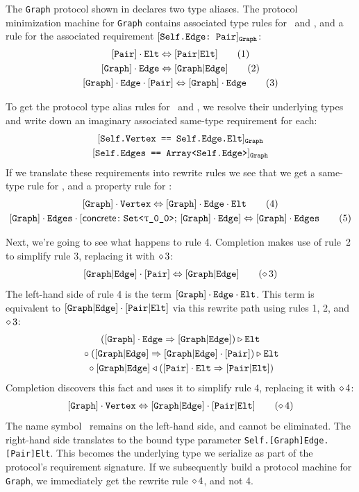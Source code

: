 \documentclass[../generics]{subfiles}
\begin{document}
\begin{example}\label{ex:graph proto}
The \texttt{Graph} protocol shown in  declares two type aliases. The protocol minimization machine for \texttt{Graph} contains associated type rules for \nEl\ and \nEd, and a rule for the associated requirement $[\texttt{Self.Edge:~Pair}]_{\texttt{Graph}}$:
\begin{gather*}
\AssocRule{Pair}{Elt}\tag{1}\\
\AssocRule{Graph}{Edge}\tag{2}\\
\ConfRule{\pGraph\cdot\nEd}{\pPair}\tag{3}
\end{gather*}

To get the protocol type alias rules for \nV\ and \nES, we resolve their underlying types and write down an imaginary associated same-type requirement for each:
\begin{gather*}
\AssocSameReq{Self.Vertex}{Self.Edge.Elt}{Graph}\\
\AssocSameReq{Self.Edges}{Array<Self.Edge>}{Graph}
\end{gather*}
If we translate these requirements into rewrite rules we see that we get a same-type rule for \nV, and a property rule for \nES:
\begin{gather*}
\SameRule{\pGraph \cdot \nV}{\pGraph \cdot \nEd \cdot \nEl}\tag{4}\\
\ConfRule{\pGraph \cdot \nES}{\concretesym{\texttt{Set<\rT>};\, \pGraph\cdot\nEd}}\tag{5}
\end{gather*}

Next, we're going to see what happens to rule 4. Completion makes use of rule~2 to simplify rule 3, replacing it with $\diamond\, 3$:
\begin{gather*}
\ConfRule{\aEd}{\pPair}\tag{$\CRule{3}$}
\end{gather*}
The left-hand side of rule 4 is the term $[\texttt{Graph}] \cdot \texttt{Edge} \cdot \texttt{Elt}$. This term is equivalent to $[\texttt{Graph}|\texttt{Edge}] \cdot [\texttt{Pair}|\texttt{Elt}]$ via this rewrite path using rules 1, 2, and $\diamond\, 3$:
\begin{gather*}
([\texttt{Graph}] \cdot \texttt{Edge} \Rightarrow [\texttt{Graph}|\texttt{Edge}]) \triangleright \texttt{Elt}\\
{} \circ ([\texttt{Graph}|\texttt{Edge}] \Rightarrow [\texttt{Graph}|\texttt{Edge}] \cdot [\texttt{Pair}]) \triangleright \texttt{Elt}\\
{} \circ [\texttt{Graph}|\texttt{Edge}] \triangleleft ([\texttt{Pair}] \cdot \texttt{Elt} \Rightarrow [\texttt{Pair}|\texttt{Elt}])
\end{gather*}
Completion discovers this fact and uses it to simplify rule 4, replacing it with $\diamond\, 4$:
\begin{gather*}
\SameRule{\pGraph \cdot \nV}{\aEd \cdot \aEl}\tag{$\CRule{4}$}
\end{gather*}
The name symbol \nV\ remains on the left-hand side, and cannot be eliminated. The right-hand side translates to the bound type parameter \texttt{Self.[Graph]Edge.[Pair]Elt}. This becomes the underlying type we serialize as part of the protocol's requirement signature. If we subsequently build a protocol machine for \texttt{Graph}, we immediately get the rewrite rule $\diamond\, 4$, and not 4.
\end{example}
\end{document}
